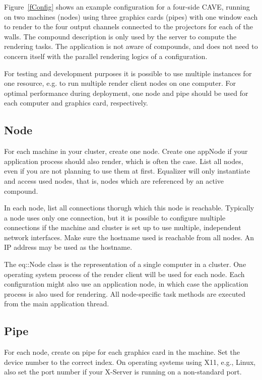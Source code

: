 \documentclass[10pt,a4]{scrartcl}
\newcommand{\fig}[1]{Figure~\ref{#1}}
\begin{document}
\fig{fConfig} shows an example configuration for a four-side
CAVE, running on two machines (nodes) using three graphics
cards (pipes) with one window each to render to the four output channels
connected to the projectors for each of the walls. The compound
description is only used by the server to compute the rendering
tasks. The application is not aware of compounds, and does not need to
concern itself with the parallel rendering logics of a configuration.

For testing and development purposes it is possible to use multiple
instances for one resource, e.g. to run multiple render client nodes on
one computer. For optimal performance during deployment, one node and
pipe should be used for each computer and graphics card, respectively.

\subsection{Node}

For each machine in your cluster, create one \textsf{node}. Create one
\textsf{appNode} if your application process should also render, which
is often the case. List all nodes, even if you are not planning to use
them at first. Equalizer will only instantiate and access used nodes,
that is, nodes which are referenced by an active compound.

In each node, list all \textsf{connection}s thorugh which this node is
reachable. Typically a node uses only one connection, but it is possible
to configure multiple connections if the machine and cluster is set up
to use multiple, independent network interfaces. Make sure the
\textsf{hostname} used is reachable from all nodes. An IP address may be
used as the hostname.

The \textsf{eq::Node} class is the representation of a single computer
in a cluster. One operating system process of the render client will be
used for each node. Each configuration might also use an application
node, in which case the application process is also used for
rendering. All node-specific task methods are executed from the main
application thread.

\subsection{Pipe}

For each node, create on \textsf{pipe} for each graphics card in the
machine. Set the \textsf{device} number to the correct index. On
operating systems using X11, e.g., Linux, also set the port number if
your X-Server is running on a non-standard port.
\end{document}
